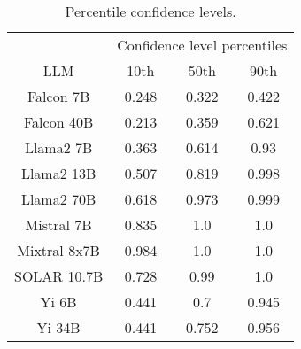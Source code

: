 \begin{table*}
\centering
\begin{tabular}{c|c|c|c}
& \multicolumn{3}{c}{Confidence level percentiles} \\ 
LLM & 10th & 50th & 90th\\ \hline
Falcon 7B & 0.248 & 0.322 & 0.422\\
Falcon 40B & 0.213 & 0.359 & 0.621\\
Llama2 7B & 0.363 & 0.614 & 0.93\\
Llama2 13B & 0.507 & 0.819 & 0.998\\
Llama2 70B & 0.618 & 0.973 & 0.999\\
Mistral 7B & 0.835 & 1.0 & 1.0\\
Mixtral 8x7B & 0.984 & 1.0 & 1.0\\
SOLAR 10.7B & 0.728 & 0.99 & 1.0\\
Yi 6B & 0.441 & 0.7 & 0.945\\
Yi 34B & 0.441 & 0.752 & 0.956\\
\hline
\end{tabular}
\caption{Percentile confidence levels.}
\label{tab:percentile_conf}
\end{table*}
